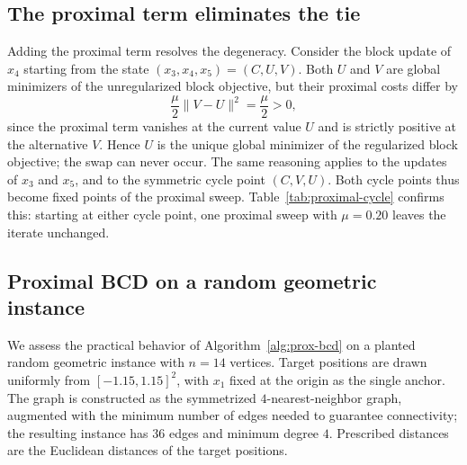 \documentclass[11pt]{article}
\begin{document}
\begin{table}[ht]
\centering

\caption{Two-cycle of the unregularized exact cyclic method arising from nonunique block minimizers.  The objective $F$ is constant and the sweep step $\|z^{r+1}-z^r\|$ does not tend to zero.}
\label{tab:cycle}
\end{table}

\subsection{The proximal term eliminates the tie}
\label{subsec:proximal-tie}

Adding the proximal term resolves the degeneracy.  Consider the block update of \(x_4\) starting from the state \((x_3,x_4,x_5)=(C,U,V)\).  Both \(U\) and \(V\) are global minimizers of the unregularized block objective, but their proximal costs differ by
\[
    \frac{\mu}{2}\|V-U\|^2
    =
    \frac{\mu}{2}
    >
    0,
\]
since the proximal term vanishes at the current value \(U\) and is strictly positive at the alternative \(V\).  Hence \(U\) is the unique global minimizer of the regularized block objective; the swap can never occur.  The same reasoning applies to the updates of \(x_3\) and \(x_5\), and to the symmetric cycle point \((C,V,U)\).  Both cycle points thus become fixed points of the proximal sweep.  Table~\ref{tab:proximal-cycle} confirms this: starting at either cycle point, one proximal sweep with \(\mu=0.20\) leaves the iterate unchanged.

\begin{table}[ht]
\centering

\caption{One proximal sweep (\(\mu=0.20\)) starting at each point of the unregularized two-cycle.  The iterate is unchanged, confirming that both cycle points are fixed points of the proximal method.}
\label{tab:proximal-cycle}
\end{table}

\subsection{Proximal BCD on a random geometric instance}
\label{subsec:random}

We assess the practical behavior of Algorithm~\ref{alg:prox-bcd} on a planted random geometric instance with \(n=14\) vertices.  Target positions are drawn uniformly from \([-1.15,1.15]^2\), with \(x_1\) fixed at the origin as the single anchor.  The graph is constructed as the symmetrized \(4\)-nearest-neighbor graph, augmented with the minimum number of edges needed to guarantee connectivity; the resulting instance has \(36\) edges and minimum degree \(4\).  Prescribed distances are the Euclidean distances of the target positions.
\end{document}
